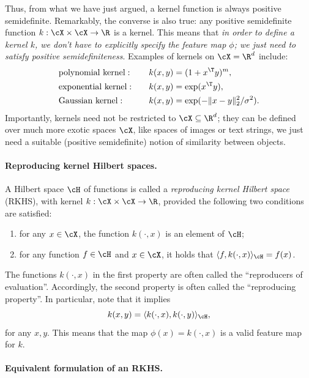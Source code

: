 \documentclass{article}
\begin{document}
Thus, from what we have just argued, a kernel function is always positive
semidefinite. Remarkably, the converse is also true: any positive semidefinite
function $k : \cX \times \cX \to \R$ is a kernel. This means that \emph{in order
  to define a kernel $k$, we don't have to explicitly specify the feature map 
  $\phi$; we just need to satisfy positive semidefiniteness}. Examples of
kernels on $\cX = \R^d$ include: 
\begin{alignat*}{3}
&\text{polynomial kernel}: \quad && k(x,y) = (1 + x^\T y)^m, \\
&\text{exponential kernel}: \quad && k(x,y) = \exp(x^\T y), \\
&\text{Gaussian kernel}: \quad && k(x,y) = \exp(-\|x-y\|_2^2 / \sigma^2). 
\end{alignat*}
Importantly, kernels need not be restricted to $\cX \subseteq \R^d$; they can be
defined over much more exotic spaces $\cX$, like spaces of images or text
strings, we just need a suitable (positive semidefinite) notion of similarity
between objects.   

\paragraph{Reproducing kernel Hilbert spaces.} 

A Hilbert space $\cH$ of functions is called a \emph{reproducing kernel Hilbert
  space} (RKHS), with kernel $k : \cX \times \cX \to \R$, provided the following
two conditions are satisfied:  
\begin{enumerate}
\item for any $x \in \cX$, the function $k(\cdot, x)$ is an element of $\cH$;   
\item for any function $f \in \cH$ and $x \in \cX$, it holds that $\langle f,
  k(\cdot, x) \rangle_\cH = f(x)$. 
\end{enumerate}
The functions $k(\cdot, x)$ in the first property are often called the
``reproducers of evaluation''. Accordingly, the second property is often called
the ``reproducing property''. In particular, note that it implies
\[
k(x,y) = \langle k(\cdot, x), k(\cdot, y) \rangle_\cH,
\]
for any $x,y$. This means that the map $\phi(x) = k(\cdot, x)$ is a valid
feature map for $k$.  

\paragraph{Equivalent formulation of an RKHS.}
\end{document}
